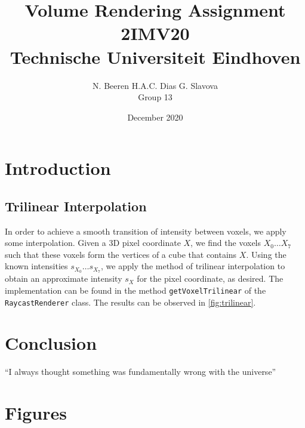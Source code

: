 \documentclass[a4paper]{article}
\title{Volume Rendering Assignment\\2IMV20\\Technische Universiteit Eindhoven}
\author{N. Beeren \quad H.A.C. Dias \quad G. Slavova\\Group 13}
\date{December 2020}
\begin{document}
\maketitle

\section{Introduction}

\subsection{Trilinear Interpolation}

In order to achieve a smooth transition of intensity between voxels, we apply some interpolation. Given a 3D pixel coordinate $X$, we find the voxels $X_0 \ldots X_7$ such that these voxels form the vertices of a cube that contains $X$. Using the known intensities $s_{X_0}\ldots s_{X_7}$, we apply the method of trilinear interpolation to obtain an approximate intensity $s_X$ for the pixel coordinate, as desired. The implementation can be found in the method {\tt getVoxelTrilinear} of the {\tt RaycastRenderer} class. The results can be observed in \autoref{fig:trilinear}.

\section{Conclusion}
``I always thought something was fundamentally wrong with the universe'' \citep{adams1995hitchhiker}




\appendix
\section{Figures}
\end{document}
